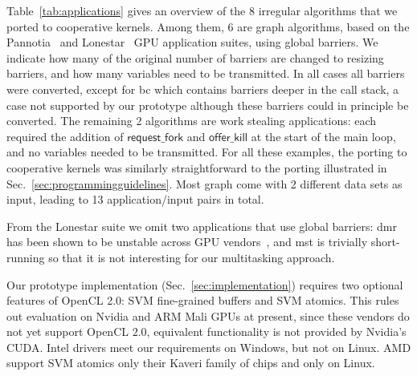 \documentclass[parskip=half,sigconf,review, anonymous=true, acmcopyrightmode=none]{acmart}
\newcommand{\mytablong}{Table~}
\newcommand{\mysec}{Sec.~}
\newcommand{\nvidia}{Nvidia\xspace}
\newcommand{\offerfork}{\mathsf{request\_fork}}
\newcommand{\offerkill}{\mathsf{offer\_kill}}
\begin{document}

\mytablong\ref{tab:applications} gives an overview of the 8 irregular
algorithms that we ported to cooperative kernels. Among them, 6 are
graph algorithms, based on the Pannotia~\cite{Pannotia} and
Lonestar~\cite{BNP12} GPU application suites, using global barriers.
We indicate how many of the original number of barriers are changed to
resizing barriers, and how many variables need to be transmitted.  In
all cases all barriers were converted, except for bc which contains
barriers deeper in the call stack, a case not supported by our
prototype although these barriers could in principle be converted. The
remaining 2 algorithms are work stealing applications: each required
the addition of $\offerfork$ and $\offerkill$ at the start of the main
loop, and no variables needed to be transmitted.  For all these
examples, the porting to cooperative kernels was similarly
straightforward to the porting illustrated in
\mysec\ref{sec:programmingguidelines}. Most
graph come with 2 different data sets as input, leading to 13
application/input pairs in total.

From the Lonestar suite we omit two applications that use global
barriers: dmr has been shown to be unstable across GPU
vendors~\cite{DBLP:conf/iwocl/SorensenD16}, and mst is trivially
short-running so that it is not interesting for our multitasking
approach.

Our prototype implementation (\mysec\ref{sec:implementation}) requires
two optional features of OpenCL 2.0: SVM fine-grained buffers and SVM
atomics. This rules out evaluation on \nvidia and ARM Mali GPUs at
present, since these vendors do not yet support OpenCL $2.0$,
equivalent functionality is not provided by \nvidia's CUDA. Intel
drivers meet our requirements on Windows, but not on Linux. 
AMD support SVM atomics only their Kaveri family of
chips and only on Linux.%
\end{document}
